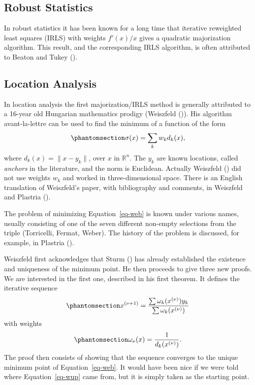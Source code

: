 \documentclass[
  12pt,
  letterpaper,
  DIV=11,
  numbers=noendperiod]{scrartcl}
\theoremstyle{definition}
\theoremstyle{definition}
\theoremstyle{plain}
\theoremstyle{plain}
\theoremstyle{plain}
\theoremstyle{remark}
\begin{document}
\subsection{Robust Statistics}\label{robust-statistics}

In robust statistics it has been known for a long time that iterative
reweighted least squares (IRLS) with weights \(f'(x)/x\) gives a
quadratic majorization algorithm. This result, and the corresponding
IRLS algorithm, is often attributed to Beaton and Tukey
().

\subsection{Location Analysis}\label{location-analysis}

In location analysis the first majorization/IRLS method is generally
attributed to a 16-year old Hungarian mathematics prodigy (Weiszfeld
()). His algorithm avant-la-lettre can
be used to find the minimum of a function of the form
\begin{equation}\phantomsection\label{eq-web}{
\sigma(x)=\sum_k w_kd_k(x),
}\end{equation} where \(d_k(x)=\|x-y_k\|\), over \(x\) in
\(\mathbb{R}^n\). The \(y_k\) are known locations, called \emph{anchors}
in the literature, and the norm is Euclidean. Actually Weiszfeld
() did not use weights \(w_k\) and
worked in three-dimensional space. There is an English translation of
Weiszfeld's paper, with bibliography and comments, in Weiszfeld and
Plastria ().

The problem of minimizing Equation~\ref{eq-web} is known under various
names, usually consisting of one of the seven different non-empty
selections from the triple (Torricelli, Fermat, Weber). The history of
the problem is discussed, for example, in Plastria
().

Weiszfeld first acknowledges that Sturm ()
has already established the existence and uniqueness of the minimum
point. He then proceeds to give three new proofs. We are interested in
the first one, described in his first theorem. It defines the iterative
sequence \begin{equation}\phantomsection\label{eq-wup}{
x^{(\nu+1)}=\frac{\sum\omega_k(x^{(\nu)})y_k}{\sum\omega_k(x^{(\nu)})}
}\end{equation} with weights
\begin{equation}\phantomsection\label{eq-ww}{
\omega_\nu(x)=\frac{1}{d_k(x^{(\nu)})}.
}\end{equation} The proof then consists of showing that the sequence
converges to the unique minimum point of Equation~\ref{eq-web}. It would
have been nice if we were told where Equation~\ref{eq-wup} came from,
but it is simply taken as the starting point.
\end{document}
